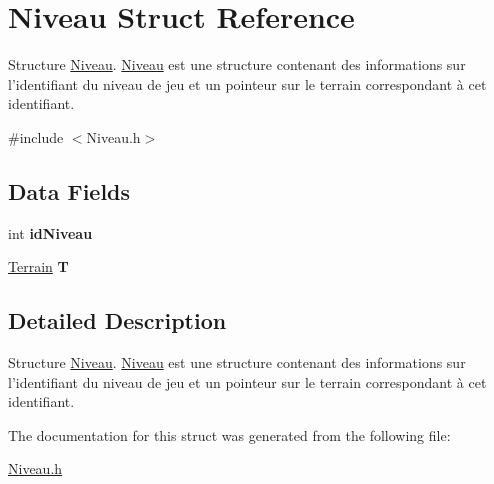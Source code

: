 \hypertarget{struct_niveau}{\section{Niveau Struct Reference}
\label{struct_niveau}
}


Structure \hyperlink{struct_niveau}{Niveau}. \hyperlink{struct_niveau}{Niveau} est une structure contenant des informations sur l'identifiant du niveau de jeu et un pointeur sur le terrain correspondant à cet identifiant.  




{\ttfamily \#include $<$Niveau.\-h$>$}

\subsection*{Data Fields}
\begin{DoxyCompactItemize}
\item 
\hypertarget{struct_niveau_aa7724b8bf750706cbd925bad359422d4}{int {\bfseries id\-Niveau}}\label{struct_niveau_aa7724b8bf750706cbd925bad359422d4}

\item 
\hypertarget{struct_niveau_a1d5b1b8a5546e5c4aac3e3cc345e3204}{\hyperlink{struct_terrain}{Terrain} {\bfseries T}}\label{struct_niveau_a1d5b1b8a5546e5c4aac3e3cc345e3204}

\end{DoxyCompactItemize}


\subsection{Detailed Description}
Structure \hyperlink{struct_niveau}{Niveau}. \hyperlink{struct_niveau}{Niveau} est une structure contenant des informations sur l'identifiant du niveau de jeu et un pointeur sur le terrain correspondant à cet identifiant. 

The documentation for this struct was generated from the following file\-:\begin{DoxyCompactItemize}
\item 
\hyperlink{_niveau_8h}{Niveau.\-h}\end{DoxyCompactItemize}
